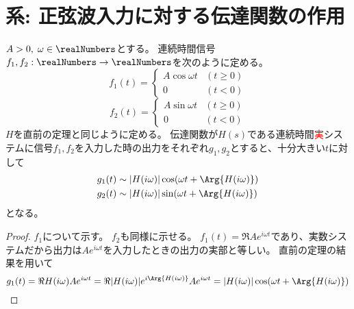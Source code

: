 		\section{系: 正弦波入力に対する伝達関数の作用}
			\begin{shadebox}
				$A>0,\;\omega \in \realNumbers$とする。
				連続時間信号$f_1,f_2: \realNumbers \to \realNumbers$を次のように定める。
				\[
					f_1(t) =
					\begin{cases}
						A\cos\omega t & (t\geq 0) \\
						0 & (t<0)
					\end{cases}
				\]
				\[
					f_2(t) =
					\begin{cases}
						A\sin\omega t & (t\geq 0) \\
						0 & (t<0)
					\end{cases}
				\]
				$H$を直前の定理と同じように定める。
				伝達関数が$H(s)$である連続時間\textcolor{red}{実}システムに信号$f_1,f_2$を入力した時の出力をそれぞれ$g_1,g_2$とすると、十分大きい$t$に対して
				\begin{align*}
					g_1(t) &\sim |H(i\omega)|\cos(\omega t + \Arg{H(i\omega)}) \\
					g_2(t) &\sim |H(i\omega)|\sin(\omega t + \Arg{H(i\omega)})
				\end{align*}
				となる。
			\end{shadebox}
			\begin{proof}
				\quad\par
				$f_1$について示す。
				$f_2$も同様に示せる。
				$f_1(t) = \Re{Ae^{i\omega t}}$であり、実数システムだから出力は$Ae^{i\omega t}$を入力したときの出力の実部と等しい。
				直前の定理の結果を用いて
				\[ g_1(t) = \Re{H(i\omega)Ae^{i\omega t}} = \Re{|H(i\omega)|e^{i\Arg{H(i\omega)}}Ae^{i\omega t}} = |H(i\omega)|\cos (\omega t + \Arg{H(i\omega)}) \]
			\end{proof}
